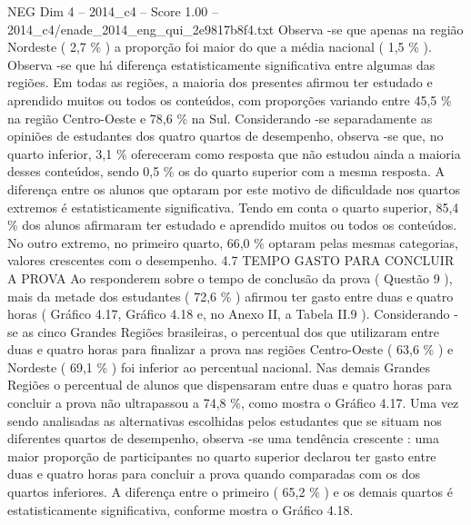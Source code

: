 \begin{textsample}{NEG Dim 4 – 2014\_c4 – Score 1.00 – 2014\_c4/enade\_2014\_eng\_qui\_2e9817b8f4.txt}
Observa -se que apenas na região Nordeste ( 2,7 \% ) a proporção foi maior do que a média nacional ( 1,5 \% ).
Observa -se que há diferença estatisticamente significativa entre algumas das regiões.
Em todas as regiões, a maioria dos presentes afirmou ter estudado e aprendido muitos ou todos os conteúdos, com proporções variando entre 45,5 \% na região Centro-Oeste e 78,6 \% na Sul.
Considerando -se separadamente as opiniões de estudantes dos quatro quartos de desempenho, observa -se que, no quarto inferior, 3,1 \% ofereceram como resposta que não estudou ainda a maioria desses conteúdos, sendo 0,5 \% os do quarto superior com a mesma resposta.
A diferença entre os alunos que optaram por este motivo de dificuldade nos quartos extremos é estatisticamente significativa.
Tendo em conta o quarto superior, 85,4 \% dos alunos afirmaram ter estudado e aprendido muitos ou todos os conteúdos.
No outro extremo, no primeiro quarto, 66,0 \% optaram pelas mesmas categorias, valores crescentes com o desempenho. 4.7 TEMPO GASTO PARA CONCLUIR A PROVA Ao responderem sobre o tempo de conclusão da prova ( Questão 9 ), mais da metade dos estudantes ( 72,6 \% ) afirmou ter gasto entre duas e quatro horas ( Gráfico 4.17, Gráfico 4.18 e, no Anexo II, a Tabela II.9 ).
Considerando -se as cinco Grandes Regiões brasileiras, o percentual dos que utilizaram entre duas e quatro horas para finalizar a prova nas regiões Centro-Oeste ( 63,6 \% ) e Nordeste ( 69,1 \% ) foi inferior ao percentual nacional.
Nas demais Grandes Regiões o percentual de alunos que dispensaram entre duas e quatro horas para concluir a prova não ultrapassou a 74,8 \%, como mostra o Gráfico 4.17.
Uma vez sendo analisadas as alternativas escolhidas pelos estudantes que se situam nos diferentes quartos de desempenho, observa -se uma tendência crescente : uma maior proporção de participantes no quarto superior declarou ter gasto entre duas e quatro horas para concluir a prova quando comparadas com os dos quartos inferiores.
A diferença entre o primeiro ( 65,2 \% ) e os demais quartos é estatisticamente significativa, conforme mostra o Gráfico 4.18.

\end{textsample}
